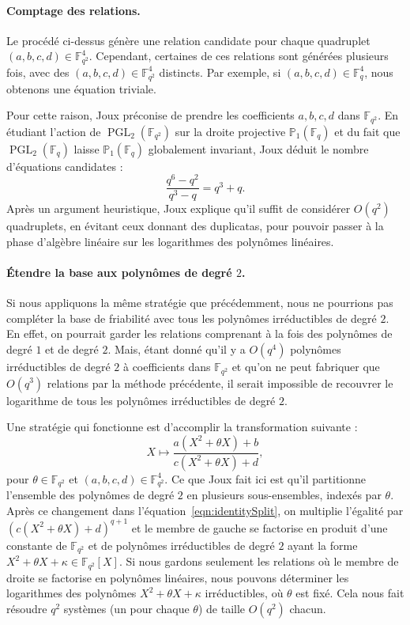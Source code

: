 \documentclass[a4paper, titlepage, 11pt]{article}
\theoremstyle{definition}
\theoremstyle{remark}
\def\O{O}
\def\gf #1{\mathbb{F}_{#1}}
\begin{document}
\paragraph{Comptage des relations.}Le procédé ci-dessus génère une relation candidate pour chaque quadruplet $(a,b,c,d) \in \gf{q^2}^4$. Cependant, certaines de ces relations sont générées plusieurs fois, avec des $(a,b,c,d)\in\gf{q^2}^4$ distincts. Par exemple, si $(a,b,c,d)\in\gf{q}^4$, nous obtenons une équation triviale.

Pour cette raison, Joux \cite{joux2013} préconise de prendre les coefficients $a,b,c,d$ dans $\gf{q^2}$. En étudiant l'action de $\operatorname{PGL}_2(\gf{q^2})$ sur la droite projective $\mathbb{P}_1(\gf{q})$ et du fait que $\operatorname{PGL}_2(\gf{q})$ laisse $\mathbb{P}_1(\gf{q})$ globalement invariant, Joux déduit le nombre d'équations candidates :
$$\frac{q^6 - q^2}{q^3 - q} = q^3 + q.$$
Après un argument heuristique, Joux \cite{joux2013} explique qu'il suffit de considérer $\O(q^2)$ quadruplets, en évitant ceux donnant des duplicatas, pour pouvoir passer à la phase d'algèbre linéaire sur les logarithmes des polynômes linéaires.

\paragraph{Étendre la base aux polynômes de degré $2$.} Si nous appliquons la même stratégie que précédemment, nous ne pourrions pas compléter la base de friabilité avec tous les polynômes irréductibles de degré $2$. En effet, on pourrait garder les relations comprenant à la fois des polynômes de degré $1$ et de degré $2$. Mais, étant donné qu'il y a $\O(q^4)$ polynômes irréductibles de degré $2$ à coefficients dans $\gf{q^2}$ et qu'on ne peut fabriquer que $\O(q^3)$ relations par la méthode précédente, il serait impossible de recouvrer le logarithme de tous les polynômes irréductibles de degré $2$.

Une stratégie qui fonctionne est d'accomplir la transformation suivante :
$$X \mapsto \frac{a(X^2+\theta X) + b}{c(X^2 + \theta X) +d},$$
pour $\theta \in \gf{q^2}$ et $(a,b,c,d) \in \gf{q^2}^4$. Ce que Joux \cite{joux2013} fait ici est qu'il partitionne l'ensemble des polynômes de degré $2$ en plusieurs sous-ensembles, indexés par $\theta$. Après ce changement dans l'équation~\ref{eqn:identitySplit}, on multiplie l'égalité par $\left(c(X^2+\theta X) +d\right)^{q+1}$ et le membre de gauche se factorise en  produit d'une constante de $\gf{q^2}$ et de polynômes irréductibles de degré $2$ ayant la forme $X^2 + \theta X + \kappa \in \gf{q^2}[X]$. Si nous gardons seulement les relations où le membre de droite se factorise en polynômes linéaires, nous pouvons déterminer les logarithmes des polynômes $X^2 +\theta X + \kappa$ irréductibles, où $\theta$ est fixé. Cela nous fait résoudre $q^2$ systèmes (un pour chaque $\theta$) de taille $\O(q^2)$ chacun.
\end{document}
